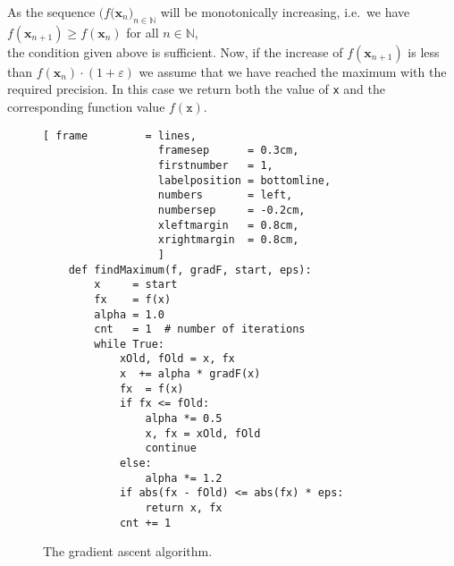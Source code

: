 \begin{enumerate}
      As the sequence $\bigl(f(\mathbf{x}_n\bigr)_{n\in\mathbb{N}}$ will be monotonically
      increasing, i.e.~we have
      \\[0.2cm]
      \hspace*{1.3cm}
      $f(\mathbf{x}_{n+1}) \geq f(\mathbf{x}_{n})$ \quad for all $n\in\mathbb{N}$,
      \\[0.2cm]
      the condition given above is sufficient.  Now, if the increase of  $f(\mathbf{x}_{n+1})$ is less than $f(\mathbf{x}_{n}) \cdot (1 + \varepsilon)$ 
      we assume that we have reached the maximum with the required precision.  In this case we return both the
      value of \texttt{x} and the corresponding function value $f(\mathtt{x})$.
\end{enumerate}

\begin{figure}[!ht]
\centering
\begin{Verbatim}[ frame         = lines, 
                  framesep      = 0.3cm, 
                  firstnumber   = 1,
                  labelposition = bottomline,
                  numbers       = left,
                  numbersep     = -0.2cm,
                  xleftmargin   = 0.8cm,
                  xrightmargin  = 0.8cm,
                  ]
    def findMaximum(f, gradF, start, eps):
        x     = start
        fx    = f(x)
        alpha = 1.0
        cnt   = 1  # number of iterations
        while True:
            xOld, fOld = x, fx
            x  += alpha * gradF(x)
            fx  = f(x)
            if fx <= fOld:   
                alpha *= 0.5
                x, fx = xOld, fOld
                continue
            else:
                alpha *= 1.2
            if abs(fx - fOld) <= abs(fx) * eps:
                return x, fx
            cnt += 1                  
\end{Verbatim}
\vspace*{-0.3cm}
\caption{The gradient ascent algorithm.}
\label{fig:gradient-ascent.py}
\end{figure}

